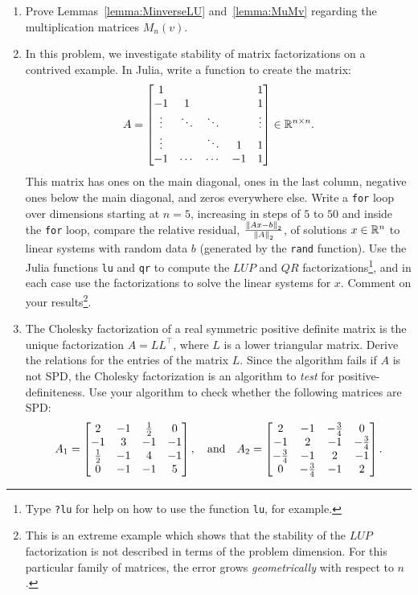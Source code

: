 \begin{enumerate}

\item Prove Lemmas~\ref{lemma:MinverseLU} and~\ref{lemma:MuMv} regarding the multiplication matrices $M_n(v)$.

\item In this problem, we investigate stability of matrix factorizations on a contrived example. In {\sc Julia}, write a function to create the matrix:
\[
A = \begin{bmatrix} 1 & & & & 1\\ -1 & 1 & & & 1\\ \vdots & \ddots & \ddots & & \vdots\\ \vdots & & \ddots & 1 & 1\\ -1 & \cdots & \cdots & -1 & 1\end{bmatrix} \in \mathbb{R}^{n\times n}.
\]
This matrix has ones on the main diagonal, ones in the last column, negative ones below the main diagonal, and zeros everywhere else. Write a {\tt for} loop over dimensions starting at $n=5$, increasing in steps of $5$ to $50$ and inside the {\tt for} loop, compare the relative residual, $\frac{\left\|{Ax - b}\right\|_2}{\left\|{A}\right\|_2}$, of solutions $x\in\mathbb{R}^n$ to linear systems with random data $b$ (generated by the {\tt rand} function). Use the {\sc Julia} functions {\tt lu} and {\tt qr} to compute the $LUP$ and $QR$ factorizations\footnote{Type {\tt ?lu} for help on how to use the function {\tt lu}, for example.}, and in each case use the factorizations to solve the linear systems for $x$. Comment on your results\footnote{This is an extreme example which shows that the stability of the $LUP$ factorization is not described in terms of the problem dimension. For this particular family of matrices, the error grows {\em geometrically} with respect to $n$.}.

\item The Cholesky factorization of a real symmetric positive definite matrix is the unique factorization $A=LL^\top$, where $L$ is a lower triangular matrix. Derive the relations for the entries of the matrix $L$. Since the algorithm fails if $A$ is not SPD, the Cholesky factorization is an algorithm to {\em test} for positive-definiteness. Use your algorithm to check whether the following matrices are SPD:
\[
A_1 = \begin{bmatrix} 2 & -1 & \tfrac{1}{2} & 0\\ -1 & 3 & -1 & -1\\ \tfrac{1}{2} & -1 & 4 & -1\\ 0 & -1 & -1 & 5\end{bmatrix},\quad{\rm and}\quad A_2 = \begin{bmatrix} 2 & -1 & -\tfrac{3}{4} & 0\\ -1 & 2 & -1 & -\tfrac{3}{4}\\ -\tfrac{3}{4} & -1 & 2 & -1\\ 0 & -\tfrac{3}{4} & -1 & 2\end{bmatrix}.
\]


\end{enumerate}
